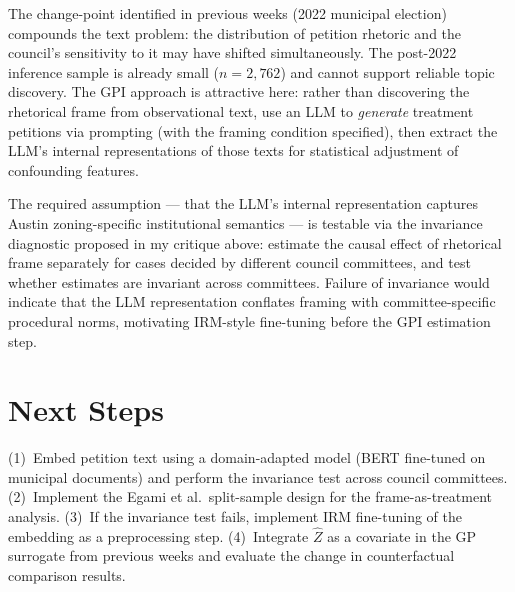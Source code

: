 \documentclass[11pt,twoside]{article}
\begin{document}
The change-point identified in previous weeks (2022 municipal election) compounds the text problem: the distribution of petition rhetoric and the council's sensitivity to it may have shifted simultaneously. The post-2022 inference sample is already small ($n = 2{,}762$) and cannot support reliable topic discovery. The \citet{imai2024gpi} GPI approach is attractive here: rather than discovering the rhetorical frame from observational text, use an LLM to \textit{generate} treatment petitions via prompting (with the framing condition specified), then extract the LLM's internal representations of those texts for statistical adjustment of confounding features.

The required assumption --- that the LLM's internal representation captures Austin zoning-specific institutional semantics --- is testable via the invariance diagnostic proposed in my critique above: estimate the causal effect of rhetorical frame separately for cases decided by different council committees, and test whether estimates are invariant across committees. Failure of invariance would indicate that the LLM representation conflates framing with committee-specific procedural norms, motivating IRM-style fine-tuning before the GPI estimation step.

\section*{Next Steps}
(1)~Embed petition text using a domain-adapted model (BERT fine-tuned on municipal documents) and perform the invariance test across council committees. (2)~Implement the Egami et al.\ split-sample design for the frame-as-treatment analysis. (3)~If the invariance test fails, implement IRM fine-tuning of the embedding as a preprocessing step. (4)~Integrate $\hat{Z}$ as a covariate in the GP surrogate from previous weeks and evaluate the change in counterfactual comparison results.

\vspace{-0.5em}
{\scriptsize
\setlength{\bibsep}{0pt}


}
\end{document}

